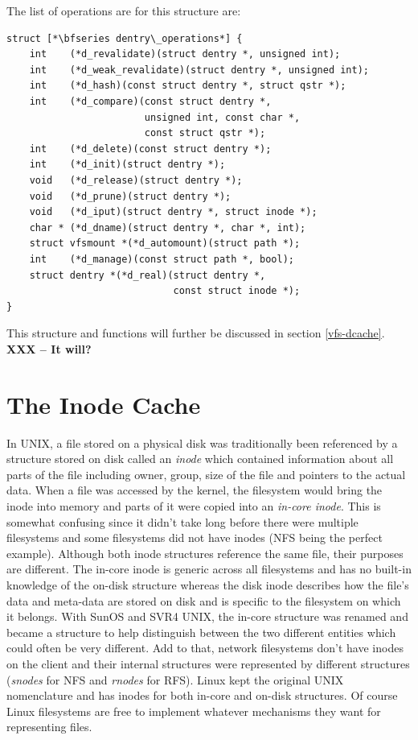 The list of operations are for this structure are:

\begin{lstlisting}
struct [*\bfseries dentry\_operations*] {
    int    (*d_revalidate)(struct dentry *, unsigned int);
    int    (*d_weak_revalidate)(struct dentry *, unsigned int);
    int    (*d_hash)(const struct dentry *, struct qstr *);
    int    (*d_compare)(const struct dentry *,
                        unsigned int, const char *, 
                        const struct qstr *);
    int    (*d_delete)(const struct dentry *);
    int    (*d_init)(struct dentry *);
    void   (*d_release)(struct dentry *);
    void   (*d_prune)(struct dentry *);
    void   (*d_iput)(struct dentry *, struct inode *);
    char * (*d_dname)(struct dentry *, char *, int);
    struct vfsmount *(*d_automount)(struct path *);
    int    (*d_manage)(const struct path *, bool);
    struct dentry *(*d_real)(struct dentry *, 
                             const struct inode *);
}
\end{lstlisting}

\noindent
This structure and functions will further be discussed in section \ref{vfs-dcache}. \textbf{XXX -- It will?}


\section{The Inode Cache}\label{kstruct-inodes}

In UNIX, a file stored on a physical disk was traditionally been referenced by a structure stored on disk called an \textit{inode} which contained information about all parts of the file including owner, group, size of the file and pointers to the actual data. When a file was accessed by the kernel, the filesystem would bring the inode into memory and parts of it were copied into an \textit{in-core inode}. This is somewhat confusing since it didn't take long before there were multiple filesystems and some filesystems did not have inodes (NFS being the perfect example). Although both inode structures reference the same file, their purposes are different. The in-core inode is generic across all filesystems and has no built-in knowledge of the on-disk structure whereas the disk inode describes how the file's data and meta-data are stored on disk and is specific to the filesystem on which it belongs. With SunOS and SVR4 UNIX, the in-core structure was renamed and became a  structure to help distinguish between the two different entities which could often be very different. Add to that, network filesystems don't have inodes on the client and their internal structures were represented by different structures (\textit{snodes} for NFS and \textit{rnodes} for RFS). Linux kept the original UNIX nomenclature and has inodes for both in-core and on-disk structures. Of course Linux filesystems are free to implement whatever mechanisms they want for representing files. 

